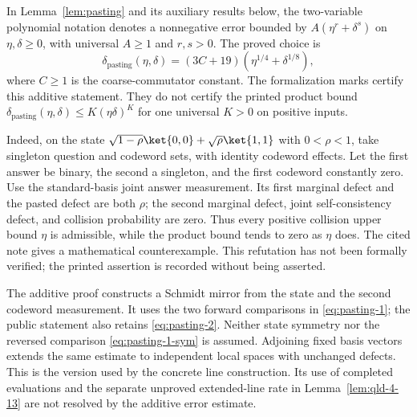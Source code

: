\begin{remark}
  \label{rem:pasting-product-error}
  In Lemma~\ref{lem:pasting} and its auxiliary results below, the
  two-variable polynomial notation denotes a nonnegative error bounded by
  $A(\eta^r+\delta^s)$ on $\eta,\delta\geq0$, with universal $A\geq1$
  and $r,s>0$. The proved choice is
  \[
    \delta_{\mathrm{pasting}}(\eta,\delta)
      =(3C+19)(\eta^{1/4}+\delta^{1/8}),
  \]
  where $C\geq1$ is the coarse-commutator constant. The formalization
  marks certify this additive statement. They do not certify the printed
  product bound $\delta_{\mathrm{pasting}}(\eta,\delta)\leq K(\eta\delta)^K$
  for one universal $K>0$ on positive inputs.

  Indeed, on the state
  $\sqrt{1-\rho}\ket{0,0}+\sqrt\rho\ket{1,1}$ with $0<\rho<1$, take
  singleton question and codeword sets, with identity codeword effects.
  Let the first answer be binary, the second a singleton, and the first
  codeword constantly zero. Use the standard-basis joint answer measurement.
  Its first marginal defect and the pasted defect are both $\rho$; the
  second marginal defect, joint self-consistency defect, and collision
  probability are zero. Thus every positive collision upper bound $\eta$
  is admissible, while the product bound tends to zero as $\eta$ does.
  The cited note \cite{gap:qpbt_pasting-product-error} gives a mathematical
  counterexample. This refutation has not been formally verified; the printed
  assertion is recorded without being asserted.

  The additive proof constructs a Schmidt mirror from the state and the
  second codeword measurement. It uses the two forward comparisons in
  \eqref{eq:pasting-1}; the public statement also retains
  \eqref{eq:pasting-2}. Neither state symmetry nor the reversed comparison
  \eqref{eq:pasting-1-sym} is assumed. Adjoining fixed basis vectors extends
  the same estimate to independent local spaces with unchanged defects.
  This is the version used by the concrete line construction. Its use of
  completed evaluations and the separate unproved extended-line rate in
  Lemma~\ref{lem:qld-4-13} are not resolved by the additive error estimate.
\end{remark}


